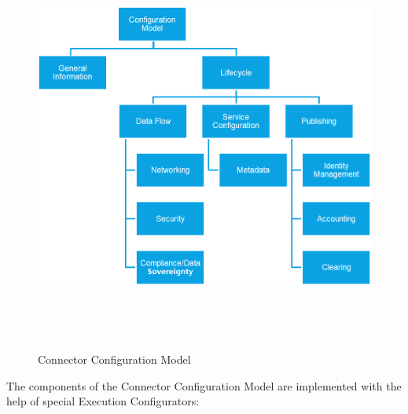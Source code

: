 
\begin{figure}[H]
	\begin{Center}
		\includegraphics[width=6.42in,height=5.37in]{./media/image56.png}
		\caption{Connector Configuration Model}
		\label{fig:Connector_Configuration_Model}
	\end{Center}
\end{figure}





The components of the Connector Configuration Model are implemented with the help of special Execution Configurators:


